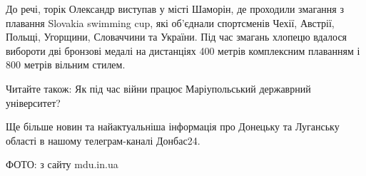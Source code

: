 До речі, торік Олександр виступав у місті Шаморін, де проходили змагання з
плавання Slovakia swimming cup, які об'єднали спортсменів Чехії, Австрії,
Польщі, Угорщини, Словаччини та України. Під час змагань хлопецю вдалося
вибороти дві бронзові медалі на дистанціях 400 метрів комплексним плаванням і
800 метрів вільним стилем.

Читайте також: Як під час війни працює Маріупольський державрний університет?

Ще більше новин та найактуальніша інформація про Донецьку та Луганську області
в нашому телеграм-каналі Донбас24.

ФОТО: з сайту mdu.in.ua
